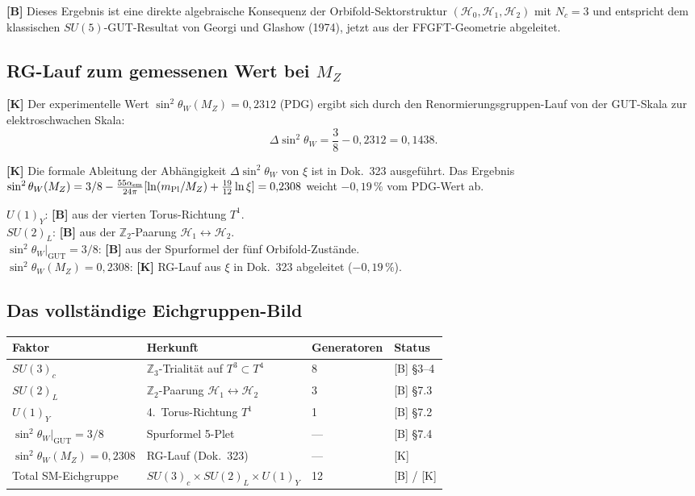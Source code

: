 \textbf{[B]} Dieses Ergebnis ist eine direkte algebraische Konsequenz
der Orbifold-Sektorstruktur $(\mathcal{H}_0, \mathcal{H}_1,
\mathcal{H}_2)$ mit $N_c = 3$ und entspricht dem klassischen
$SU(5)$-GUT-Resultat von Georgi und Glashow (1974), jetzt aus der
FFGFT-Geometrie abgeleitet.

\subsection{RG-Lauf zum gemessenen Wert bei $M_Z$}

\textbf{[K]} Der experimentelle Wert $\sin^2\theta_W(M_Z) = 0{,}2312$
(PDG) ergibt sich durch den Renormierungsgruppen-Lauf von der
GUT-Skala zur elektroschwachen Skala:
\begin{equation}
  \Delta\sin^2\theta_W
  = \frac{3}{8} - 0{,}2312 = 0{,}1438.
  \label{eq:delta}
\end{equation}

\textbf{[K]} Die formale Ableitung der Abhängigkeit
$\Delta\sin^2\theta_W$ von $\xi$ ist in Dok.~323 ausgeführt. Das Ergebnis
$\sin^2\theta_W(M_Z) = 3/8 - \frac{55\alpha_{\rm em}}{24\pi}
[\ln(m_{\rm Pl}/M_Z) + \frac{19}{12}\ln\xi] = 0{,}2308$
weicht $-0{,}19\,\%$ vom PDG-Wert ab.

\begin{tcolorbox}[colback=blue!4!white, colframe=blue!45!black,
  title={Statusbilanz $SU(2)_L \times U(1)_Y$}]
$U(1)_Y$: \textbf{[B]} aus der vierten Torus-Richtung $T^1$.\\
$SU(2)_L$: \textbf{[B]} aus der $\mathbb{Z}_2$-Paarung
$\mathcal{H}_1\leftrightarrow\mathcal{H}_2$.\\
$\sin^2\theta_W|_{\mathrm{GUT}} = 3/8$: \textbf{[B]} aus der
Spurformel der fünf Orbifold-Zustände.\\
$\sin^2\theta_W(M_Z) = 0{,}2308$: \textbf{[K]} RG-Lauf aus $\xi$
in Dok.~323 abgeleitet ($-0{,}19\,\%$).
\end{tcolorbox}

\subsection{Das vollständige Eichgruppen-Bild}

\begin{center}
\begin{tabular}{llll}
\toprule
Faktor & Herkunft & Generatoren & Status \\
\midrule
$SU(3)_c$ & $\mathbb{Z}_3$-Trialität auf $T^3 \subset T^4$
  & 8 & [B] §3--4 \\
$SU(2)_L$ & $\mathbb{Z}_2$-Paarung
  $\mathcal{H}_1\leftrightarrow\mathcal{H}_2$
  & 3 & [B] §7.3 \\
$U(1)_Y$  & 4.\ Torus-Richtung $T^1$
  & 1 & [B] §7.2 \\
\midrule
$\sin^2\theta_W|_{\mathrm{GUT}} = 3/8$ & Spurformel 5-Plet
  & — & [B] §7.4 \\
$\sin^2\theta_W(M_Z) = 0{,}2308$ & RG-Lauf (Dok.~323)
  & — & [K] \\
\midrule
Total SM-Eichgruppe &
  $SU(3)_c\times SU(2)_L\times U(1)_Y$ & 12 & [B] / [K] \\
\bottomrule
\end{tabular}
\end{center}

